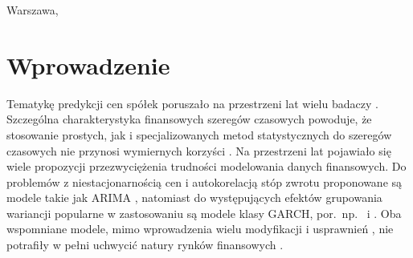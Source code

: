 \documentclass[12pt,a4paper,twoside,openany]{book}
\begin{document}
\begin{center}
Warszawa, \the\year
\end{center}
\thispagestyle{empty}

\clearpage
\thispagestyle{empty}
\mbox{}
\clearpage

\tableofcontents

\clearpage

\chapter{Wprowadzenie}

Tematykę predykcji cen spółek poruszało na przestrzeni lat wielu badaczy \citep[np.][]{almanza2006,xu2014,ferreira2008,rajput2016}. Szczególna charakterystyka finansowych szeregów czasowych powoduje, że stosowanie prostych, jak i specjalizowanych metod statystycznych do szeregów czasowych nie przynosi wymiernych korzyści \citep{kwiatkowski1992}. Na przestrzeni lat pojawiało się wiele propozycji przezwyciężenia trudności modelowania danych finansowych. Do problemów z niestacjonarnością cen i autokorelacją stóp zwrotu proponowane są modele takie jak ARIMA \citep{adebiyi2014,bontempi2012}, natomiast do występujących efektów grupowania wariancji popularne w zastosowaniu są modele klasy GARCH, por.~np.~\citet{zhang2009} i \citet{arowolo2013}. Oba wspomniane modele, mimo wprowadzenia wielu modyfikacji i usprawnień \citep{jiang2012}, nie potrafiły w pełni uchwycić natury rynków finansowych \citep{degooijer2006}. 
\end{document}

